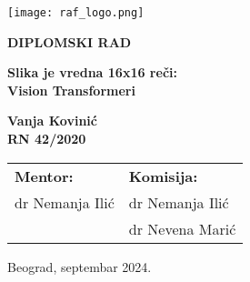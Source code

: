 \documentclass[12pt]{article}
\begin{document}
   \begin{titlepage}
      \begin{center}
         
         \vspace*{-1in}
         \texttt{[image: raf\_logo.png]}

         \vspace{1in}
         \Large
         \textbf{DIPLOMSKI RAD}
         
         \vspace{1in}
         \Huge
         \textbf{Slika je vredna 16x16 reči: \\ Vision Transformeri}
         
         \vspace{1in}


         \fontsize{14pt}{18pt}\selectfont
         \textbf{Vanja Kovinić} \\
         \textbf{RN 42/2020}
         \vspace*{1.5in}
         
         \begin{center}
            \normalsize
            \begin{tabular}{p{} p{}}
               \fontsize{14pt}{18pt}\selectfont   
               \textbf{Mentor:} & 
            
               \fontsize{14pt}{18pt}\selectfont
               \textbf{Komisija:} \\
               dr Nemanja Ilić & dr Nemanja Ilić \\
                                 & dr Nevena Marić \\
            \end{tabular}
         \end{center}

         \vspace*{\fill}

         \normalsize
         Beograd, septembar 2024.


         
      \end{center}
   \end{titlepage}
   \restoregeometry %
\end{document}
